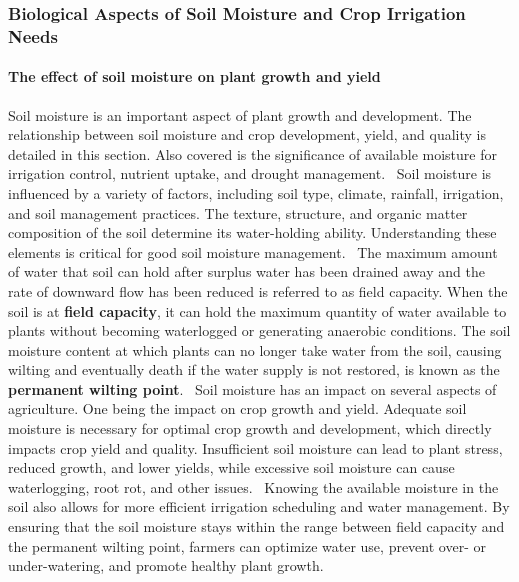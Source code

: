 \documentclass[11pt]{scrartcl} %
\begin{document}
\subsubsection{Biological Aspects of Soil Moisture and Crop Irrigation Needs}
\paragraph{The effect of soil moisture on plant growth and yield}
Soil moisture is an important aspect of plant growth and development. The relationship between soil moisture and crop development, yield, and quality is detailed in this section. Also covered is the significance of available moisture for irrigation control, nutrient uptake, and drought management.~\parencite{soil_moisture_plant_water}
\newline Soil moisture is influenced by a variety of factors, including soil type, climate, rainfall, irrigation, and soil management practices. The texture, structure, and organic matter composition of the soil determine its water-holding ability. Understanding these elements is critical for good soil moisture management.~\parencite{soil_moisture_plant_water}
\newline The maximum amount of water that soil can hold after surplus water has been drained away and the rate of downward flow has been reduced is referred to as field capacity. When the soil is at \textbf{field capacity}, it can hold the maximum quantity of water available to plants without becoming waterlogged or generating anaerobic conditions. The soil moisture content at which plants can no longer take water from the soil, causing wilting and eventually death if the water supply is not restored, is known as the \textbf{permanent wilting point}.~\parencite{soil_moisture_plant_water}
\newline Soil moisture has an impact on several aspects of agriculture. One being the impact on crop growth and yield. Adequate soil moisture is necessary for optimal crop growth and development, which directly impacts crop yield and quality. Insufficient soil moisture can lead to plant stress, reduced growth, and lower yields, while excessive soil moisture can cause waterlogging, root rot, and other issues.~\parencite{soil_moisture_plant_water}
\newline Knowing the available moisture in the soil also allows for more efficient irrigation scheduling and water management. By ensuring that the soil moisture stays within the range between field capacity and the permanent wilting point, farmers can optimize water use, prevent over- or under-watering, and promote healthy plant growth.~\parencite{soil_moisture_plant_water}
\end{document}
